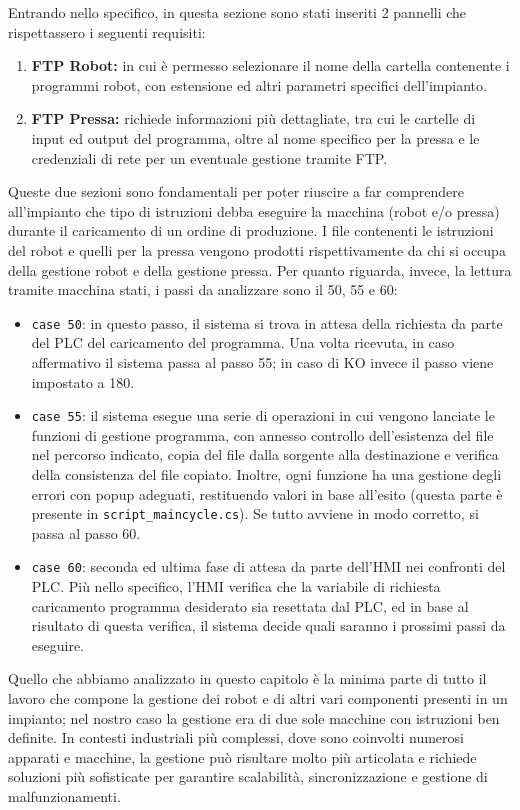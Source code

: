 Entrando nello specifico, in questa sezione sono stati inseriti 2 pannelli che rispettassero i seguenti requisiti:
\begin{enumerate}
    \item \textbf{FTP Robot:} in cui è permesso selezionare il nome della cartella contenente i programmi robot, con estensione ed altri parametri specifici dell'impianto.
    \item \textbf{FTP Pressa:} richiede informazioni più dettagliate, tra cui le cartelle di input ed output del programma, oltre al nome specifico per la pressa e le credenziali di rete per un eventuale gestione tramite FTP.
\end{enumerate}
Queste due sezioni sono fondamentali per poter riuscire a far comprendere all'impianto che tipo di istruzioni debba eseguire la macchina (robot e/o pressa) durante il caricamento di un ordine di produzione. I file contenenti le istruzioni del robot e quelli per la pressa vengono prodotti rispettivamente da chi si occupa della gestione robot e della gestione pressa. Per quanto riguarda, invece, la lettura tramite macchina stati, i passi da analizzare sono il 50, 55 e 60:
\begin{itemize}
    \item \verb|case 50|: in questo passo, il sistema si trova in attesa della richiesta da parte del PLC del caricamento del programma. Una volta ricevuta, in caso affermativo il sistema passa al passo 55; in caso di KO invece il passo viene impostato a 180.
    \item \verb|case 55|: il sistema esegue una serie di operazioni in cui vengono lanciate le funzioni di gestione programma, con annesso controllo dell'esistenza del file nel percorso indicato, copia del file dalla sorgente alla destinazione e verifica della consistenza del file copiato. Inoltre, ogni funzione ha una gestione degli errori con popup adeguati, restituendo valori in base all'esito (questa parte è presente in \verb|script_maincycle.cs|). Se tutto avviene in modo corretto, si passa al passo 60.
    \item \verb|case 60|: seconda ed ultima fase di attesa da parte dell'HMI nei confronti del PLC. Più nello specifico, l'HMI verifica che la variabile di richiesta caricamento programma desiderato sia resettata dal PLC, ed in base al risultato di questa verifica, il sistema decide quali saranno i prossimi passi da eseguire.
\end{itemize}
Quello che abbiamo analizzato in questo capitolo è la minima parte di tutto il lavoro che compone la gestione dei robot e di altri vari componenti presenti in un impianto; nel nostro caso la gestione era di due sole macchine con istruzioni ben definite. In contesti industriali più complessi, dove sono coinvolti numerosi apparati e macchine, la gestione può risultare molto più articolata e richiede soluzioni più sofisticate per garantire scalabilità, sincronizzazione e gestione di malfunzionamenti.

